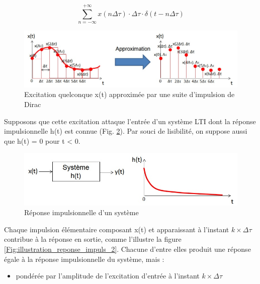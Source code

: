 \documentclass[]{book}
\begin{document}
{	
	\begin{equation*}\label{}
	\sum_{n=-\infty}^{+\infty}x(n\Delta \tau) \cdot	\Delta \tau \cdot \delta (t-n\Delta \tau)	
	\end{equation*}
	
	\begin{figure}[h!]
		\centering
		\includegraphics[scale=0.5]{images/Approx_excitation_Dirac.jpg} 
		\caption{Excitation quelconque x(t) approximée par une suite d'impulsion de Dirac}	
		\label{Fig:Approx_excitation_Dirac}
	\end{figure}
	Supposons que cette excitation attaque l'entrée d'un système LTI dont la réponse impulsionnelle h(t) est connue (Fig. \ref{Fig:reponse_impuls_illustration}). Par souci de lisibilité, on suppose aussi que h(t) = 0 pour t < 0.
	\begin{figure}[h!]
		\centering
		\includegraphics[scale=0.5]{images/reponse_impuls_illustration.jpg} 
		\caption{Réponse impulsionnelle d'un système}	
		\label{Fig:reponse_impuls_illustration}
	\end{figure}	
	
	Chaque impulsion élémentaire composant x(t) et apparaissant à l'instant
	$ k \times \Delta \tau $ contribue à la réponse en sortie, comme l'illustre la figure \ref{Fig:illustration_reponse_impuls_2}. Chacune d'entre elles produit une réponse égale à la réponse impulsionnelle du système, mais :
	
	\begin{itemize}
		\item pondérée par l'amplitude de l'excitation d'entrée à l'instant $ k \times \Delta \tau $
	

\end{itemize}}
\end{document}
